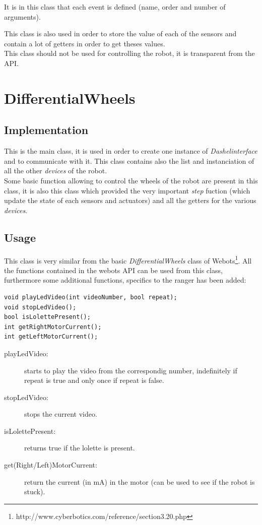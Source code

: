 \documentclass[a4paper,11pt]{report}
\begin{document}
It is in this class that each event is defined (name, order and number of arguments).

This class is also used in order to store the value of each of the sensors and contain a lot of getters in order to get theses values.\\

This class should not be used for controlling the robot, it is transparent from the API.\\

\newpage
\section{DifferentialWheels}
\subsection{Implementation}
This is the main class, it is used in order to create one instance of \textit{Dashelinterface} and to communicate with it. This class contains also the list and instanciation of all the other \textit{devices} of the robot.\\

Some basic function allowing to control the wheels of the robot are present in this class, it is also this class which provided the very important \textit{step} fuction (which update the state of each sensors and actuators) and all the getters for the various \textit{devices}.\\

\subsection{Usage}
This class is very similar from the basic \textit{DifferentialWheels} class of Webots\footnote{http://www.cyberbotics.com/reference/section3.20.php}. All the functions contained in the webots API can be used from this class, furthermore some additional functions, specifics to the ranger has been added:

\lstset{language=c++} 
\lstset{commentstyle=\textit} 
\begin{lstlisting} 
void playLedVideo(int videoNumber, bool repeat);
void stopLedVideo();
bool isLolettePresent();
int getRightMotorCurrent();
int getLeftMotorCurrent();
\end{lstlisting}

\begin{description}
  \item[playLedVideo:] starts to play the video from the correspondig number, indefinitely if repeat is true and only once if repeat is false.
  \item[stopLedVideo:] stops the current video.
  \item[isLolettePresent:] returns true if the lolette is present.
  \item[get(Right/Left)MotorCurrent:] return the current (in mA) in the motor (can be used to see if the robot is stuck).
\end{description}
\end{document}
